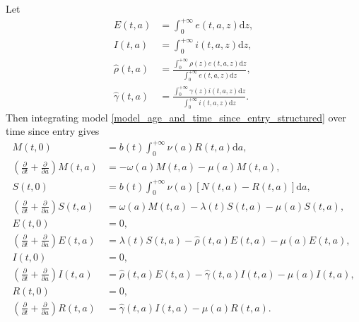 \documentclass[USenglish]{article}
\newcommand{\md}{\mathrm{d}}
\begin{document}
Let
\begin{subequations}
  \begin{align}
    E(t, a)
    &= \int_0^{+\infty} e(t, a, z) \md z,
    \\
    I(t, a)
    &= \int_0^{+\infty} i(t, a, z) \md z,
    \\
    \hat{\rho}(t, a)
    &= \frac{\int_0^{+\infty} \rho(z) e(t, a, z) \md z}
      {\int_0^{+\infty} e(t, a, z) \md z},
    \\
    \hat{\gamma}(t, a)
    &= \frac{\int_0^{+\infty} \gamma(z) i(t, a, z) \md z}
      {\int_0^{+\infty} i(t, a, z) \md z}.
  \end{align}
\end{subequations}
Then integrating model
\eqref{model_age_and_time_since_entry_structured} over time since
entry gives
\begin{subequations}
  \label{model_age_and_time_since_entry_structured_agg_tse}
  \begin{align}
    M(t, 0) &=
    b(t) \int_0^{+\infty} \nu(a) R(t, a) \md a,
    \\
    \left(\frac{\partial}{\partial t}
      + \frac{\partial}{\partial a}\right)
    M(t, a) &=
    - \omega(a) M(t, a) - \mu(a) M(t, a),
    \\
    S(t, 0) &=
    b(t) \int_0^{+\infty} \nu(a) \left[N(t, a) - R(t, a)\right] \md a,
    \\
    \left(\frac{\partial}{\partial t}
      + \frac{\partial}{\partial a}\right)
    S(t, a) &=
    \omega(a) M(t, a) - \lambda(t) S(t, a) - \mu(a) S(t, a),
    \\
    E(t, 0) &= 0,
    \\
    \left(\frac{\partial}{\partial t}
      + \frac{\partial}{\partial a}\right)
    E(t, a)
    &= \lambda(t) S(t, a)
    - \hat{\rho}(t, a) E(t, a) - \mu(a) E(t, a),
    \\
    I(t, 0) &= 0,
    \\
    \left(\frac{\partial}{\partial t}
      + \frac{\partial}{\partial a}\right)
    I(t, a)
    &= \hat{\rho}(t, a) E(t, a)
    - \hat{\gamma}(t, a) I(t, a) - \mu(a) I(t, a),
    \\
    R(t, 0) &= 0,
    \\
    \left(\frac{\partial}{\partial t}
      + \frac{\partial}{\partial a}\right)
    R(t, a)
    &= \hat{\gamma}(t, a) I(t, a) - \mu(a) R(t, a).
  \end{align}
\end{subequations}
\end{document}
